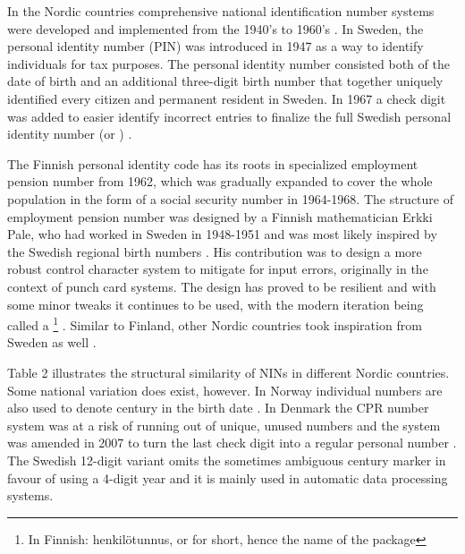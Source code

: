 In the Nordic countries comprehensive national identification number systems were developed and implemented from the 1940's to 1960's \citep{watson2010}. In Sweden, the personal identity number (PIN) was introduced in 1947 as a way to identify individuals for tax purposes. The personal identity number consisted both of the date of birth and an additional three-digit birth number that together uniquely identified every citizen and permanent resident in Sweden. In 1967 a check digit was added to easier identify incorrect entries to finalize the full Swedish personal identity number (or ) \citep{johansson2003,scb2016}. 

The Finnish personal identity code has its roots in specialized employment pension number from 1962, which was gradually expanded to cover the whole population in the form of a social security number in 1964-1968. The structure of employment pension number was designed by a Finnish mathematician Erkki Pale, who had worked in Sweden in 1948-1951 and was most likely inspired by the Swedish regional birth numbers \citep{alastalo2022}. His contribution was to design a more robust control character system to mitigate for input errors, originally in the context of punch card systems. The design has proved to be resilient and with some minor tweaks it continues to be used, with the modern iteration being called a \footnote{In Finnish: henkilötunnus, or  for short, hence the name of the package} \citep{salste2021}. Similar to Finland, other Nordic countries took inspiration from Sweden as well \citep{Krogness2011}. 

Table 2 illustrates the structural similarity of NINs in different Nordic countries. Some national variation does exist, however. In Norway individual numbers are also used to denote century in the birth date \citep{furseth2015}. In Denmark the CPR number system was at a risk of running out of unique, unused numbers and the system was amended in 2007 to turn the last check digit into a regular personal number \citep{cpr2008, jerlach2009}. The Swedish 12-digit variant omits the sometimes ambiguous century marker in favour of using a 4-digit year and it is mainly used in automatic data processing systems.

